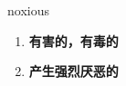 
\begin{frame}
{\huge noxious}
\begin{center}
\begin{enumerate}\Large
  \item \textbf{有害的，有毒的}
  \item \textbf{产生强烈厌恶的}
\end{enumerate}
\end{center}
\end{frame}
